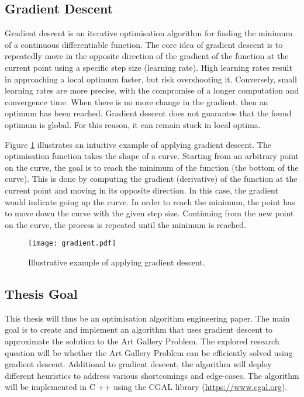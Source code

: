 \newpage
\subsection{Gradient Descent}

Gradient descent is an iterative optimisation algorithm for finding the minimum of a continuous differentiable function. The core idea of gradient descent is to repeatedly move in the opposite direction of the gradient of the function at the current point using a specific step size (learning rate). High learning rates result in approaching a local optimum faster, but risk overshooting it. Conversely, small learning rates are more precise, with the compromise of a longer computation and convergence time.
When there is no more change in the gradient, then an optimum has been reached. Gradient descent does not guarantee that the found optimum is global. For this reason, it can remain stuck in local optima.

Figure \ref{fig:gradient_descent} illustrates an intuitive example of applying gradient descent. The optimisation function takes the shape of a curve. Starting from an arbitrary point on the curve, the goal is to reach the minimum of the function (the bottom of the curve). This is done by computing the gradient (derivative) of the function at the current point and moving in its opposite direction. In this case, the gradient would indicate going up the curve. In order to reach the minimum, the point has to move down the curve with the given step size. Continuing from the new point on the curve, the process is repeated until the minimum is reached.

\begin{figure}[h!]
    \centering
    \texttt{[image: gradient.pdf]}
    \caption{Illustrative example of applying gradient descent.}
    \label{fig:gradient_descent}
\end{figure}

\subsection{Thesis Goal}
This thesis will thus be an optimisation algorithm engineering paper. The main goal is to create and implement an algorithm that uses gradient descent to approximate the solution to the Art Gallery Problem. The explored research question will be whether the Art Gallery Problem can be efficiently solved using gradient descent. Additional to gradient descent, the algorithm will deploy different heuristics to address various shortcomings and edge-cases.
The algorithm will be implemented in C ++ using the CGAL library (\url{https://www.cgal.org}).

